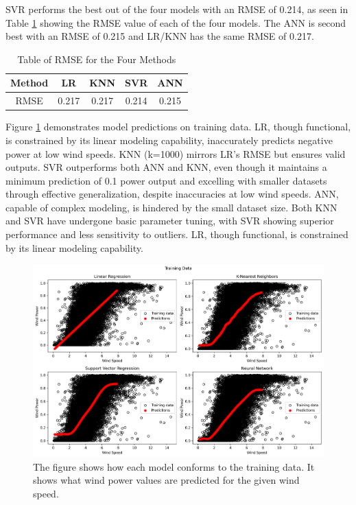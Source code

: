 \documentclass[a4paper, article, oneside, USenglish, IN5460]{memoir}
\begin{document}
SVR performs the best out of the four models with an RMSE of 0.214, as seen in Table \ref{tab:q1-RMSE-comparison}  showing the RMSE value of each of the four models. The ANN is second best with an RMSE of 0.215 and LR/KNN has the same RMSE of 0.217.

\begin{table}[H]
    \centering
    \begin{tabular}{|c|c|c|c|c|} \hline 
        Method & LR & KNN & SVR & ANN\\ \hline 
        RMSE&  0.217&  0.217&  0.214& 0.215\\ \hline
    \end{tabular}
    \caption{Table of RMSE for the Four Methods}
    \label{tab:q1-RMSE-comparison}
\end{table}

Figure \ref{fig:q1-training-data} demonstrates model predictions on training data. LR, though functional, is constrained by its linear modeling capability, inaccurately predicts negative power at low wind speeds. KNN (k=1000) mirrors LR's RMSE but ensures valid outputs. SVR outperforms both ANN and KNN, even though it maintains a minimum prediction of 0.1 power output and excelling with smaller datasets through effective generalization, despite inaccuracies at low wind speeds. ANN, capable of complex modeling, is hindered by the small dataset size. Both KNN and SVR have undergone basic parameter tuning, with SVR showing superior performance and less sensitivity to outliers. LR, though functional, is constrained by its linear modeling capability.
\begin{figure}[H]
    \centering
    \includegraphics[width=1\linewidth]{fig/q1-ALL-training.png}
    \caption{The figure shows how each model conforms to the training data. It shows what wind power values are predicted for the given wind speed.}
    \label{fig:q1-training-data}
\end{figure}
\end{document}
